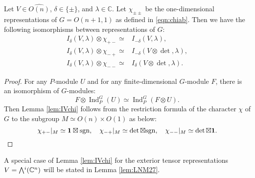 \begin{lemma}
\label{lem:IVchi}
Let $V \in \widehat {O(n)}$, 
 $\delta \in \{\pm\}$, 
 and $\lambda \in {\mathbb{C}}$.  
Let $\chi_{\pm\pm}$ be the one-dimensional representations
 of $G=O(n+1,1)$
 as defined in \eqref{eqn:chiab}.  
Then we have the following isomorphisms
 between representations of $G$:  
\begin{align*}
I_{\delta}(V,\lambda) \otimes \chi_{+-} \simeq & I_{-\delta}(V,\lambda), 
\\
I_{\delta}(V,\lambda) \otimes \chi_{-+} \simeq & I_{-\delta}(V \otimes \det,\lambda), 
\\
I_{\delta}(V,\lambda) \otimes \chi_{--} \simeq & I_{\delta}(V\otimes \det,\lambda).  
\end{align*}
\end{lemma}

\begin{proof}
For any $P$-module $U$
 and for any finite-dimensional $G$-module $F$, 
 there is an isomorphism of $G$-modules:
\[
  F \otimes {\operatorname{Ind}}_P^G(U)
  \simeq
  {\operatorname{Ind}}_P^G(F \otimes U).  
\]
Then Lemma \ref{lem:IVchi} follows from the restriction formula
 of the character $\chi$ of $G$ to the subgroup $M \simeq O(n) \times O(1)$ as below:
\[
   \chi_{+-}|_M \simeq {\bf{1}} \boxtimes {\operatorname{sgn}}, 
\quad   
   \chi_{-+}|_M \simeq \det \boxtimes {\operatorname{sgn}}, 
\quad
   \chi_{--}|_M \simeq \det \boxtimes {\bf{1}}.  
\]
\end{proof}

A special case of Lemma \ref{lem:IVchi} 
 for the exterior tensor representations $V=\Exterior^i({\mathbb{C}}^n)$
 will be stated in Lemma \ref{lem:LNM27}.  


